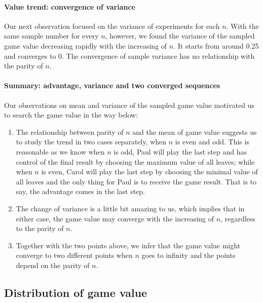 \documentclass[a4paper,english]{article}
\begin{document}
\begin{spacing}{1.4}
\paragraph{Value trend: convergence of variance}
Our next observation focused on the variance of experiments for each $n$. With the same sample number for every $n$, however, we found the variance of the sampled game value decreasing rapidly with the increasing of $n$. It starts from around 0.25 and converges to 0. The convergence of sample variance has no relationship with the parity of $n$.
\paragraph{Summary: advantage, variance and two converged sequences}
Our observations on mean and variance of the sampled game value motivated us to search the game value in the way below:
\begin{enumerate}
    \item The relationship between parity of $n$ and the mean of game value suggests us to study the trend in two cases separately, when $n$ is even and odd. This is reasonable as we know when $n$ is odd, Paul will play the last step and has control of the final result by choosing the maximum value of all leaves; while when $n$ is even, Carol will play the last step by choosing the minimal value of all leaves and the only thing for Paul is to receive the game result. That is to say, the advantage comes in the last step.
    \item The change of variance is a little bit amazing to us, which implies that in either case, the game value may converge with the increasing of $n$, regardless to the parity of $n$.
    \item Together with the two points above, we infer that the game value might converge to two different points when $n$ goes to infinity and the points depend on the parity of $n$.
\end{enumerate}

\subsection{Distribution of game value}


\end{spacing}
\end{document}
